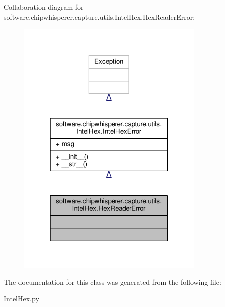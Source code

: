 Collaboration diagram for software.\+chipwhisperer.\+capture.\+utils.\+Intel\+Hex.\+Hex\+Reader\+Error\+:\nopagebreak
\begin{figure}[H]
\begin{center}
\leavevmode
\includegraphics[width=256pt]{d4/d8f/classsoftware_1_1chipwhisperer_1_1capture_1_1utils_1_1IntelHex_1_1HexReaderError__coll__graph}
\end{center}
\end{figure}


The documentation for this class was generated from the following file\+:\begin{DoxyCompactItemize}
\item 
\hyperlink{IntelHex_8py}{Intel\+Hex.\+py}\end{DoxyCompactItemize}

